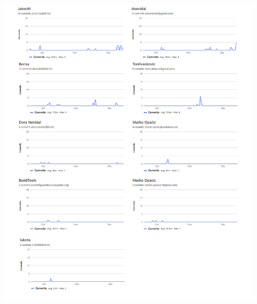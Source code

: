             	    \begin{minipage}{\linewidth}
                    	\includegraphics[scale=0.47]{slike/Graf aktivnosti - 2.png} %
            			\centering
                        \label{fig:grarf_aktivnosti_2}
                    \end{minipage}
		
	